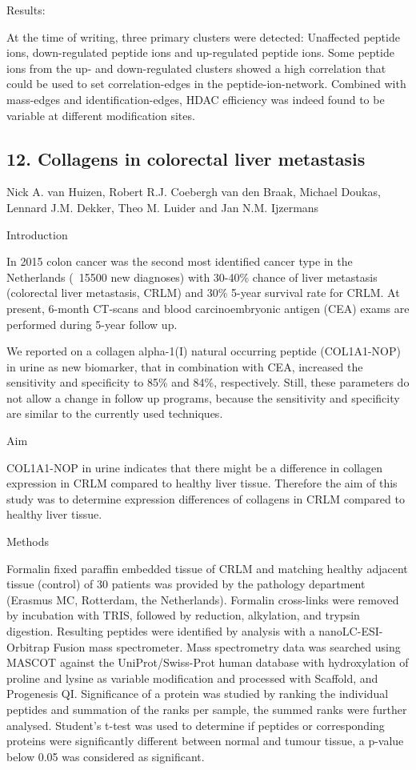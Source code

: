 Results:

At the time of writing, three primary clusters were detected: Unaffected peptide ions, down-regulated peptide ions and up-regulated peptide ions. Some peptide ions from the up- and down-regulated clusters showed a high correlation that could be used to set correlation-edges in the peptide-ion-network. Combined with mass-edges and identification-edges, HDAC efficiency was indeed found to be variable at different modification sites.

\subsection*{\color{eubicRed} 12. Collagens in colorectal liver metastasis}
{\color{eubicGray}Nick A. van Huizen, Robert R.J. Coebergh van den Braak, Michael Doukas, Lennard J.M. Dekker, Theo M. Luider and Jan N.M. Ijzermans}

Introduction

In 2015 colon cancer was the second most identified cancer type in the Netherlands (~15500 new diagnoses) with 30-40\% chance of liver metastasis (colorectal liver metastasis, CRLM) and 30\% 5-year survival rate for CRLM. At present, 6-month CT-scans and blood carcinoembryonic antigen (CEA) exams are performed during 5-year follow up.

We reported on a collagen alpha-1(I) natural occurring peptide (COL1A1-NOP) in urine as new biomarker, that in combination with CEA, increased the sensitivity and specificity to 85\% and 84\%, respectively. Still, these parameters do not allow a change in follow up programs, because the sensitivity and specificity are similar to the currently used techniques.


Aim

COL1A1-NOP in urine indicates that there might be a difference in collagen expression in CRLM compared to healthy liver tissue. Therefore the aim of this study was to determine expression differences of collagens in CRLM compared to healthy liver tissue.


Methods

Formalin fixed paraffin embedded tissue of CRLM and matching healthy adjacent tissue (control) of 30 patients was provided by the pathology department (Erasmus MC, Rotterdam, the Netherlands). Formalin cross-links were removed by incubation with TRIS, followed by reduction, alkylation, and trypsin digestion. Resulting peptides were identified by analysis with a nanoLC-ESI-Orbitrap Fusion mass spectrometer. Mass spectrometry data was searched using MASCOT against the UniProt/Swiss-Prot human database with hydroxylation of proline and lysine as variable modification and processed with Scaffold, and Progenesis QI. Significance of a protein was studied by ranking the individual peptides and summation of the ranks per sample, the summed ranks were further analysed. Student’s t-test was used to determine if peptides or corresponding proteins were significantly different between normal and tumour tissue, a p-value below 0.05 was considered as significant.


